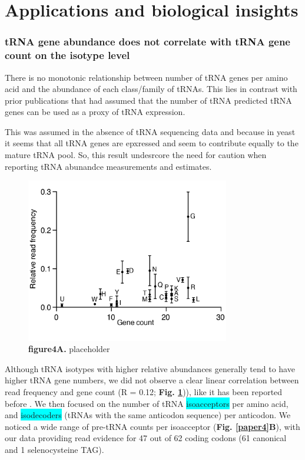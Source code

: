 \documentclass[12pt]{rockefeller}
\newcommand{\cyan}[1]{\colorbox{cyan}{#1}}
\begin{document}
\section{Applications and biological insights}

\subsubsection{tRNA gene abundance does not correlate with tRNA gene count on the isotype level}

There is no monotonic relationship between number of tRNA genes per amino acid and the abundance of each class/family of tRNAs. This lies in contrast with prior publications that had assumed that the number of tRNA predicted tRNA genes can be used as a proxy of tRNA expression. 

This was assumed in the absence of tRNA sequencing data and because in yeast it seems that all tRNA genes are epxressed and seem to contribute equally to the mature tRNA pool. 
So, this result undesrcore the need for caution when reporting tRNA abunandce measurements and estimates.

\begin{figure}[!ht]%
\centering
\includegraphics[width=3.5in]{paper4A.png}%
\caption[figure4A]
{\textbf{figure4A.}
placeholder}
\centering
\label{paper4A}%
\end{figure}

Although tRNA isotypes with higher relative abundances generally tend to have higher tRNA gene numbers, we did not observe a clear linear correlation between read frequency and gene count (R = 0.12; \textbf{Fig. \ref{paper4A}})), like it has been reported before \cite{Tuller:2010ge}. We then focused on the number of tRNA \cyan{isoacceptors} per amino acid, and \cyan{isodecoders} (tRNAs with the same anticodon sequence) per anticodon. We noticed a wide range of pre-tRNA counts per isoacceptor (\textbf{Fig. \ref{paper4}B}), with our data providing read evidence for 47 out of 62 coding codons (61 canonical and 1 selenocysteine TAG). 
\end{document}

